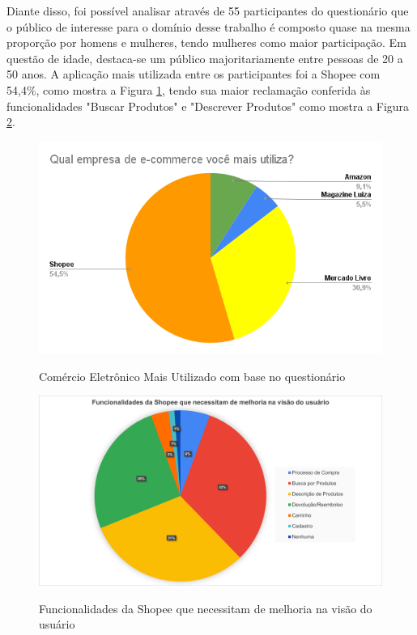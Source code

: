 Diante disso, foi possível analisar através de 55 participantes do questionário que o público de interesse para o domínio desse trabalho é composto quase na mesma proporção por homens e mulheres, tendo mulheres como maior participação. Em questão de idade, destaca-se um público majoritariamente entre pessoas de 20 a 50 anos. A aplicação mais utilizada entre os participantes foi a Shopee com 54,4\%, como mostra a Figura \ref{ShopeeGrafico}, tendo sua maior reclamação conferida às funcionalidades "Buscar Produtos" e "Descrever Produtos" como mostra a Figura \ref{FuncionalidadeShopee}.

\begin{figure}[ht]
    \centering
    \caption{Comércio Eletrônico Mais Utilizado com base no questionário}
    \includegraphics[keepaspectratio=true,scale=0.5]{figuras/empresa.png}
    \label{ShopeeGrafico}
\end{figure}

\begin{figure}[ht]
    \centering
    \caption{Funcionalidades da Shopee que necessitam de melhoria na visão do usuário}
    \includegraphics[keepaspectratio=true,scale=0.4]{figuras/Media_Funcionalidades_Shopee.png}
    \label{FuncionalidadeShopee}
\end{figure}

